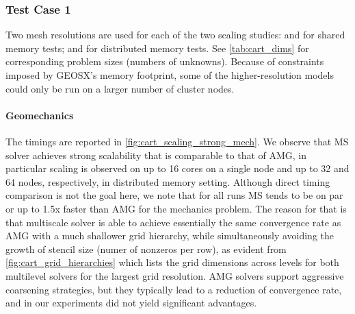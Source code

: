 \subsubsection{Test Case 1}

Two mesh resolutions are used for each of the two scaling studies:  and  for shared memory tests;  and  for distributed memory tests.   See \cref{tab:cart_dims} for corresponding problem sizes (numbers of unknowns).   Because of constraints imposed by GEOSX's memory footprint, some of the higher-resolution models could only be run on a larger number of cluster nodes.

\paragraph{Geomechanics}
The timings are reported in \cref{fig:cart_scaling_strong_mech}.   We observe that MS solver achieves strong scalability that is comparable to that of AMG, in particular scaling is observed on up to 16 cores on a single node and up to 32 and 64 nodes, respectively, in distributed memory setting.   Although direct timing comparison is not the goal here, we note that for all runs MS tends to be on par or up to 1.5x faster than AMG for the mechanics problem.   The reason for that is that multiscale solver is able to achieve essentially the same convergence rate as AMG with a much shallower grid hierarchy, while simultaneously avoiding the growth of stencil size (numer of nonzeros per row), as evident from \cref{fig:cart_grid_hierarchies} which lists the grid dimensions across levels for both multilevel solvers for the largest grid resolution.   AMG solvers support aggressive coarsening strategies, but they typically lead to a reduction of convergence rate, and in our experiments did not yield significant advantages.

